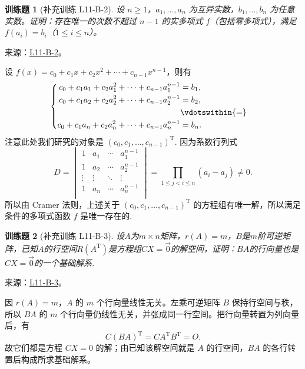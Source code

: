 \documentclass[UTF8,12pt,a4paper,fontset=fandol]{ctexart}
\newtheorem{exercise}{训练题}[section]
\begin{document}
\begin{exercise}[补充训练 L11-B-2]\label{prob:L11-B-2}
设 $n\ge1$，$a_1,\ldots,a_n$ 为互异实数，$b_1,\ldots,b_n$ 为任意实数。证明：存在唯一的次数不超过 $n-1$ 的实多项式 $f$（包括零多项式），满足 $f(a_i)=b_i$（$1\le i\le n$）。
\end{exercise}
\noindent 来源：\href{https://github.com/yhwu-is/Linear-Algebra-Left-Undone/blob/new/%E8%AE%B2%E4%B9%89/%E4%B8%93%E9%A2%98/11%20%E6%9C%9D%E8%8A%B1%E5%A4%95%E6%8B%BE.tex}{L11-B-2}。
\begin{solve}
设 $f(x) = c_0+c_1x+c_2x^2+\cdots+c_{n-1}x^{n-1}$，则有
            \[\begin{cases} \begin{aligned}
                        c_0+c_1a_1+c_2a_1^2+\cdots+c_{n-1}a_1^{n-1} & = b_1,            \\
                        c_0+c_1a_2+c_2a_2^2+\cdots+c_{n-1}a_2^{n-1} & = b_2,            \\
                                                                    & \vdotswithin{ = } \\
                        c_0+c_1a_n+c_2a_n^2+\cdots+c_{n-1}a_n^{n-1} & = b_n.            \\
                    \end{aligned} \end{cases}\]
            注意此处我们研究的对象是 $(c_0, c_1, \ldots, c_{n-1})^{\mathrm{T}}$. 因为系数行列式
            \[D = \begin{vmatrix}
                    1      & a_1    & \cdots & a_1^{n-1} \\
                    1      & a_2    & \cdots & a_2^{n-1} \\
                    \vdots & \vdots & \ddots & \vdots    \\
                    1      & a_n    & \cdots & a_n^{n-1} \\
                \end{vmatrix} = \prod_{1 \leqslant j < i \leqslant n} (a_i-a_j) \neq 0.\]
            所以由 Cramer 法则，上述关于 $(c_0, c_1, \ldots, c_{n-1})^{\mathrm{T}}$ 的方程组有唯一解，所以满足条件的多项式函数 $f$ 是唯一存在的.
\end{solve}

\begin{exercise}[补充训练 L11-B-3]\label{prob:L11-B-3}
设$A$为$m \times n$矩阵，$r(A)=m$，$B$是$m$阶可逆矩阵，已知$A$的行空间$R(A^\mathrm{T})$是方程组$CX=\vec{0}$的解空间，证明：$BA$的行向量也是$CX=\vec{0}$的一个基础解系.
\end{exercise}
\noindent 来源：\href{https://github.com/yhwu-is/Linear-Algebra-Left-Undone/blob/new/%E8%AE%B2%E4%B9%89/%E4%B8%93%E9%A2%98/11%20%E6%9C%9D%E8%8A%B1%E5%A4%95%E6%8B%BE.tex}{L11-B-3}。
\begin{solve}
因 $r(A)=m$，$A$ 的 $m$ 个行向量线性无关。左乘可逆矩阵 $B$ 保持行空间与秩，所以 $BA$ 的 $m$ 个行向量仍线性无关，并张成同一行空间。把行向量转置为列向量后，有
\[C(BA)^{\mathrm T}=CA^{\mathrm T}B^{\mathrm T}=O.\]
故它们都是方程 $CX=0$ 的解；由已知该解空间就是 $A$ 的行空间，$BA$ 的各行转置后构成所求基础解系。
\end{solve}
\end{document}
